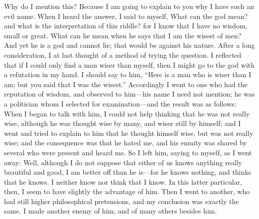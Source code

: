 \documentclass[12pt]{article}
\begin{document}
Why do I mention this? Because I am going to explain to you why I
have such an evil name. When I heard the answer, I said to myself,
What can the god mean? and what is the interpretation of this riddle?
for I know that I have no wisdom, small or great. What can he mean
when he says that I am the wisest of men? And yet he is a god and
cannot lie; that would be against his nature. After a long consideration,
I at last thought of a method of trying the question. I reflected
that if I could only find a man wiser than myself, then I might go
to the god with a refutation in my hand. I should say to him, ``Here
is a man who is wiser than I am; but you said that I was the wisest.''
Accordingly I went to one who had the reputation of wisdom, and observed
to him---his name I need not mention; he was a politician whom I selected
for examination---and the result was as follows: When I began to talk
with him, I could not help thinking that he was not really wise, although
he was thought wise by many, and wiser still by himself; and I went
and tried to explain to him that he thought himself wise, but was
not really wise; and the consequence was that he hated me, and his
enmity was shared by several who were present and heard me. So I left
him, saying to myself, as I went away: Well, although I do not suppose
that either of us knows anything really beautiful and good, I am better
off than he is---for he knows nothing, and thinks that he knows. I
neither know nor think that I know. In this latter particular, then,
I seem to have slightly the advantage of him. Then I went to another,
who had still higher philosophical pretensions, and my conclusion
was exactly the same. I made another enemy of him, and of many others
besides him.
\end{document}

